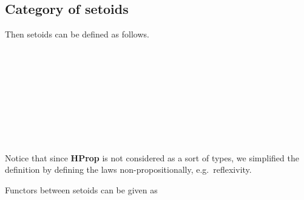 \subsection{Category of setoids}

Then setoids can be defined as follows.

\begin{code}\>\<%
\\
\>  \AgdaSymbol{:}  \<%
\\
\>[0]\<[2]%
\>[2]\<%
\\
\>[2]\<[4]%
\>[4] \AgdaSymbol{:} \<%
\\
\>[2]\<[4]%
\>[4] \<[13]%
\>[13]\AgdaSymbol{:}     \<%
\\
\>[2]\<[4]%
\>[4] \<[12]%
\>[12]\AgdaSymbol{:} \AgdaSymbol{\{} \AgdaSymbol{:} \AgdaSymbol{\}}  \AgdaFunction{<}    \AgdaFunction{>}\<%
\\
\>[2]\<[4]%
\>[4] \<[12]%
\>[12]\AgdaSymbol{:} \AgdaSymbol{\{}  \AgdaSymbol{:} \AgdaSymbol{\}}  \AgdaFunction{<}    \AgdaFunction{>}  \AgdaFunction{<}    \AgdaFunction{>}\<%
\\
\>[2]\<[4]%
\>[4] \<[12]%
\>[12]\AgdaSymbol{:} \AgdaSymbol{\{}   \AgdaSymbol{:} \AgdaSymbol{\}}  \AgdaFunction{<}    \AgdaFunction{>}  \AgdaFunction{<}    \AgdaFunction{>}  \AgdaFunction{<}    \AgdaFunction{>}\<%
\\
\>\<\end{code}

Notice that since \textbf{HProp} is not considered as a sort of types, we simplified the definition by defining the laws non-propositionally, e.g.\ reflexivity.



Functors between setoids can be given as

